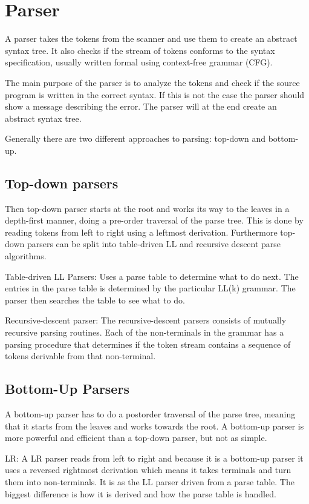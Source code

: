 \section{Parser}
A parser takes the tokens from the scanner and use them to create an abstract syntax tree. It also checks if the stream of tokens conforms to the syntax specification, usually written formal using context-free grammar (CFG).

The main purpose of the parser is to analyze the tokens and check if the source program is written in the correct syntax. If this is not the case the parser should show a message describing the error. The parser will at the end create an abstract syntax tree. 

Generally there are two different approaches to parsing: top-down and bottom-up.

\subsection*{Top-down parsers}
Then top-down parser starts at the root and works its way to the leaves in a depth-first manner, doing a pre-order traversal of the parse tree. This is done by reading tokens from left to right using a leftmost derivation. Furthermore top-down parsers can  be split into table-driven LL  and recursive descent parse algorithms.

Table-driven LL Parsers:
Uses a parse table to determine what to do next. The entries in the parse table is determined by the particular LL(k) grammar. The parser then searches the table to see what to do.

Recursive-descent parser:
The recursive-descent parsers consists of mutually recursive parsing routines. Each of the non-terminals in the grammar has a parsing procedure that determines if the token stream contains a sequence of tokens derivable from that non-terminal.

\subsection*{Bottom-Up Parsers}

A bottom-up parser has to do a postorder traversal of the parse tree, meaning that it starts from the leaves and works towards the root.
A bottom-up parser is more powerful and efficient than a top-down parser, but not as simple.

LR:
A LR parser reads from left to right and because it is a bottom-up parser it uses a reversed rightmost derivation which means it takes terminals and turn them into non-terminals. It is as the LL parser driven from a parse table. The biggest difference is how it is derived and how the parse table is handled.  

